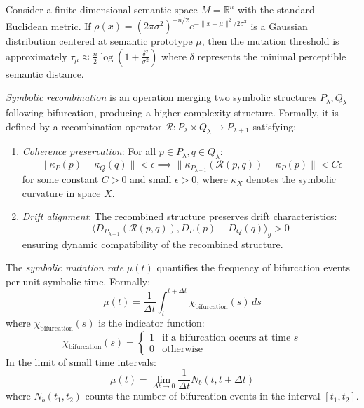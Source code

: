 \begin{scholium}
\label{scholium:bk6_mutation_threshold_in_semantic_space}
Consider a finite-dimensional semantic space $M = \mathbb{R}^n$ with the standard Euclidean metric. If $\rho(x) = (2\pi\sigma^2)^{-n/2}e^{-\|x-\mu\|^2/2\sigma^2}$ is a Gaussian distribution centered at semantic prototype $\mu$, then the mutation threshold is approximately $\tau_\mu \approx \frac{n}{2}\log(1+\frac{\delta^2}{\sigma^2})$ where $\delta$ represents the minimal perceptible semantic distance.
\end{scholium}
\begin{definition}
\label{definition:bk6_symbolic_recombination}
\emph{Symbolic recombination} is an operation merging two symbolic structures $P_\lambda, Q_\lambda$ following bifurcation, producing a higher-complexity structure. Formally, it is defined by a recombination operator $\mathcal{R}: P_\lambda \times Q_\lambda \rightarrow P_{\lambda+1}$ satisfying:
\begin{enumerate}
\item \emph{Coherence preservation}: For all $p \in P_\lambda, q \in Q_\lambda$:
\begin{equation}
\| \kappa_P(p) - \kappa_Q(q) \| < \epsilon \implies \| \kappa_{P_{\lambda+1}}(\mathcal{R}(p,q)) - \kappa_P(p) \| < C\epsilon
\end{equation}
for some constant $C > 0$ and small $\epsilon > 0$, where $\kappa_X$ denotes the symbolic curvature in space $X$.
\item \emph{Drift alignment}: The recombined structure preserves drift characteristics:
\begin{equation}
\langle D_{P_{\lambda+1}}(\mathcal{R}(p,q)), D_P(p) + D_Q(q) \rangle_g > 0
\end{equation}
ensuring dynamic compatibility of the recombined structure.
\end{enumerate}
\end{definition}
\begin{definition}
\label{definition:bk6_mutation_rate}
\label{definition:bk6_mutation_rate_emphsymbolic_mutation}
The \emph{symbolic mutation rate} $\mu(t)$ quantifies the frequency of bifurcation events per unit symbolic time. Formally:
\begin{equation}
\mu(t) = \frac{1}{\Delta t} \int_{t}^{t+\Delta t} \chi_{\text{bifurcation}}(s) \, ds
\end{equation}
where $\chi_{\text{bifurcation}}(s)$ is the indicator function:
\begin{equation}
\chi_{\text{bifurcation}}(s) = 
\begin{cases}
1 & \text{if a bifurcation occurs at time } s \\
0 & \text{otherwise}
\end{cases}
\end{equation}
In the limit of small time intervals:
\begin{equation}
\mu(t) = \lim_{\Delta t \to 0} \frac{1}{\Delta t} N_b(t, t+\Delta t)
\end{equation}
where $N_b(t_1, t_2)$ counts the number of bifurcation events in the interval $[t_1, t_2]$.
\end{definition}
